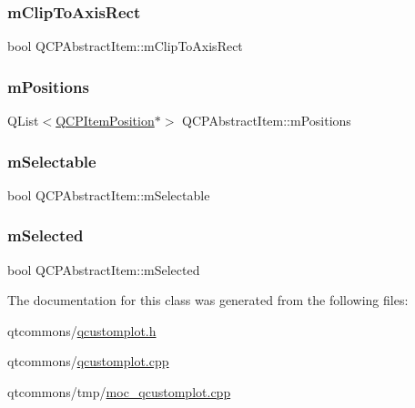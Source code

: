\subsubsection{\texorpdfstring{mClipToAxisRect}{mClipToAxisRect}}
{\footnotesize\ttfamily bool Q\+C\+P\+Abstract\+Item\+::m\+Clip\+To\+Axis\+Rect\hspace{0.3cm}{\ttfamily [protected]}}

\mbox{\label{class_q_c_p_abstract_item_af94ff71b6a15ea6d028ab8bd8eccd012}} 
\subsubsection{\texorpdfstring{mPositions}{mPositions}}
{\footnotesize\ttfamily Q\+List$<$\mbox{\hyperlink{class_q_c_p_item_position}{Q\+C\+P\+Item\+Position}}$\ast$$>$ Q\+C\+P\+Abstract\+Item\+::m\+Positions\hspace{0.3cm}{\ttfamily [protected]}}

\mbox{\label{class_q_c_p_abstract_item_ad81eb35c8726a0f458db9df9732e0e41}} 
\subsubsection{\texorpdfstring{mSelectable}{mSelectable}}
{\footnotesize\ttfamily bool Q\+C\+P\+Abstract\+Item\+::m\+Selectable\hspace{0.3cm}{\ttfamily [protected]}}

\mbox{\label{class_q_c_p_abstract_item_a4bdb3457dad1d268c0f78a44152b9645}} 
\subsubsection{\texorpdfstring{mSelected}{mSelected}}
{\footnotesize\ttfamily bool Q\+C\+P\+Abstract\+Item\+::m\+Selected\hspace{0.3cm}{\ttfamily [protected]}}



The documentation for this class was generated from the following files\+:\begin{DoxyCompactItemize}
\item 
qtcommons/\mbox{\hyperlink{qcustomplot_8h}{qcustomplot.\+h}}\item 
qtcommons/\mbox{\hyperlink{qcustomplot_8cpp}{qcustomplot.\+cpp}}\item 
qtcommons/tmp/\mbox{\hyperlink{moc__qcustomplot_8cpp}{moc\+\_\+qcustomplot.\+cpp}}\end{DoxyCompactItemize}
